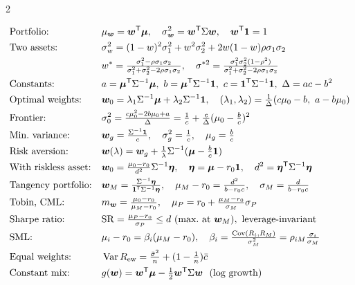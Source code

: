 \begin{paracol}{2}
\begin{keyformulas}
\begin{align*}
&\text{Portfolio:} && \mu_{\bm w}=\bm w\T\bm\mu,\quad \sigma_{\bm w}^2=\bm w\T\Sigma\bm w,\quad \bm w\T\bm 1=1\\
&\text{Two assets:} && \sigma_w^2=(1-w)^2\sigma_1^2+w^2\sigma_2^2+2w(1-w)\rho\sigma_1\sigma_2\\
& && w^*=\tfrac{\sigma_1^2-\rho\sigma_1\sigma_2}{\sigma_1^2+\sigma_2^2-2\rho\sigma_1\sigma_2},\quad
  \sigma^{*2}=\tfrac{\sigma_1^2\sigma_2^2(1-\rho^2)}{\sigma_1^2+\sigma_2^2-2\rho\sigma_1\sigma_2}\\
&\text{Constants:} && a=\bm\mu\T\Sigma^{-1}\bm\mu,\ b=\bm\mu\T\Sigma^{-1}\bm 1,\ c=\bm 1\T\Sigma^{-1}\bm 1,\ \Delta=ac-b^2\\
&\text{Optimal weights:} && \bm w_0=\lambda_1\Sigma^{-1}\bm\mu+\lambda_2\Sigma^{-1}\bm 1,\quad
  (\lambda_1,\lambda_2)=\tfrac1\Delta(c\mu_0-b,\ a-b\mu_0)\\
&\text{Frontier:} && \sigma_0^2=\tfrac{c\mu_0^2-2b\mu_0+a}\Delta=\tfrac1c+\tfrac c\Delta(\mu_0-\tfrac bc)^2\\
&\text{Min.\ variance:} && \bm w_g=\tfrac{\Sigma^{-1}\bm 1}c,\quad\sigma_g^2=\tfrac1c,\quad \mu_g=\tfrac bc\\
&\text{Risk aversion:} && \bm w(\lambda)=\bm w_g+\tfrac1\lambda\Sigma^{-1}(\bm\mu-\tfrac bc\bm 1)\\
&\text{With riskless asset:} && \bm w_0=\tfrac{\mu_0-r_0}{d^2}\Sigma^{-1}\bm\eta,\quad \bm\eta=\bm\mu-r_0\bm 1,\quad d^2=\bm\eta\T\Sigma^{-1}\bm\eta\\
&\text{Tangency portfolio:} && \bm w_M=\tfrac{\Sigma^{-1}\bm\eta}{\bm 1\T\Sigma^{-1}\bm\eta},\quad \mu_M-r_0=\tfrac{d^2}{b-r_0c},\quad
  \sigma_M=\tfrac d{b-r_0c}\\
&\text{Tobin, CML:} && m_{\bm w}=\tfrac{\mu_0-r_0}{\mu_M-r_0},\quad \mu_P=r_0+\tfrac{\mu_M-r_0}{\sigma_M}\sigma_P\\
&\text{Sharpe ratio:} && \mathrm{SR}=\tfrac{\mu_P-r_0}{\sigma_P}\le d\ \text{(max.\ at }\bm w_M),\ \text{leverage-invariant}\\
&\text{SML:} && \mu_i-r_0=\beta_i(\mu_M-r_0),\quad \beta_i=\tfrac{\Cov(R_i,R_M)}{\sigma_M^2}=\rho_{iM}\tfrac{\sigma_i}{\sigma_M}\\
&\text{Equal weights:} && \Var R_{\rm ew}=\tfrac{\bar\sigma^2}n+(1-\tfrac1n)\bar c\\
&\text{Constant mix:} && g(\bm w)=\bm w\T\bm\mu-\tfrac12\bm w\T\Sigma\bm w\ \ (\text{log growth})\\

\end{align*}
\end{keyformulas}
\end{paracol}
